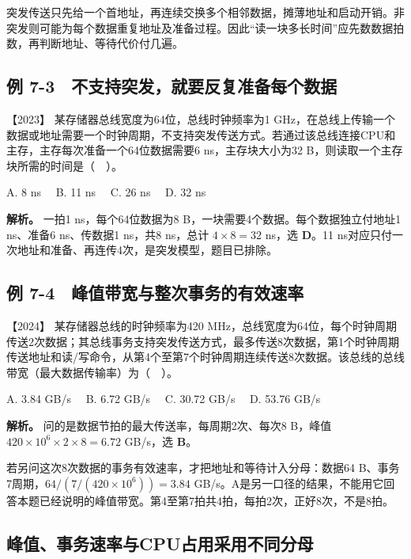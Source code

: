 突发传送只先给一个首地址，再连续交换多个相邻数据，摊薄地址和启动开销。非突发则可能为每个数据重复地址及准备过程。因此``读一块多长时间''应先数数据拍数，再判断地址、等待代价付几遍。

\subsection{例 7-3　不支持突发，就要反复准备每个数据}\label{co-ex7-3}

\noindent{}【2023】 某存储器总线宽度为64位，总线时钟频率为1 GHz，在总线上传输一个数据或地址需要一个时钟周期，不支持突发传送方式。若通过该总线连接CPU和主存，主存每次准备一个64位数据需要6 ns，主存块大小为32 B，则读取一个主存块所需的时间是（　）。

A. 8 ns　 B. 11 ns　 C. 26 ns　 D. 32 ns


\textbf{解析。} 一拍1 ns，每个64位数据为8 B，一块需要4个数据。每个数据独立付地址1 ns、准备6 ns、传数据1 ns，共8 ns，总计 \(4\times8=32\) ns，选 \textbf{D}。11 ns对应只付一次地址和准备、再连传4次，是突发模型，题目已排除。

\subsection{例 7-4　峰值带宽与整次事务的有效速率}\label{co-ex7-4}

\noindent{}【2024】 某存储器总线的时钟频率为420 MHz，总线宽度为64位，每个时钟周期传送2次数据；其总线事务支持突发传送方式，最多传送8次数据，第1个时钟周期传送地址和读/写命令，从第4个至第7个时钟周期连续传送8次数据。该总线的总线带宽（最大数据传输率）为（　）。

A. 3.84 GB/s　 B. 6.72 GB/s　 C. 30.72 GB/s　 D. 53.76 GB/s


\textbf{解析。} 问的是数据节拍的最大传送率，每周期2次、每次8 B，峰值 \(420\times10^6\times2\times8=6.72\) GB/s，选 \textbf{B}。

若另问这次8次数据的事务有效速率，才把地址和等待计入分母：数据64 B、事务7周期，\(64/(7/(420\times10^6))=3.84\) GB/s。A是另一口径的结果，不能用它回答本题已经说明的峰值带宽。第4至第7拍共4拍，每拍2次，正好8次，不是8拍。

\subsection{峰值、事务速率与CPU占用采用不同分母}\label{co-c07-h63}

